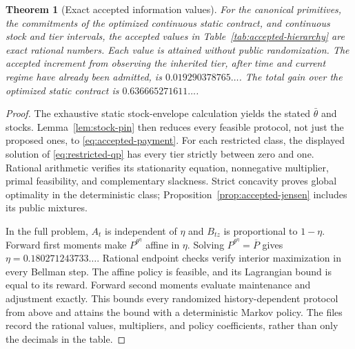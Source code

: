 \documentclass[11pt,letterpaper]{article}
\newtheorem{theorem}{Theorem}[section]
\theoremstyle{definition}
\newcommand{\1}{\mathbf 1}
\begin{document}
\begin{theorem}[Exact accepted information values]\label{thm:accepted-hierarchy}
For the canonical primitives, the commitments of the optimized continuous static contract, and continuous stock and tier intervals, the accepted values in Table~\ref{tab:accepted-hierarchy} are exact rational numbers. Each value is attained without public randomization. The accepted increment from observing the inherited tier, after time and current regime have already been admitted, is $0.019290378765\ldots$. The total gain over the optimized static contract is $0.636665271611\ldots$.
\end{theorem}
\begin{proof}
The exhaustive static stock-envelope calculation yields the stated $\bar\theta$ and stocks. Lemma~\ref{lem:stock-pin} then reduces every feasible protocol, not just the proposed ones, to \eqref{eq:accepted-payment}. For each restricted class, the displayed solution of \eqref{eq:restricted-qp} has every tier strictly between zero and one. Rational arithmetic verifies its stationarity equation, nonnegative multiplier, primal feasibility, and complementary slackness. Strict concavity proves global optimality in the deterministic class; Proposition~\ref{prop:accepted-jensen} includes its public mixtures.

In the full problem, $A_t$ is independent of $\eta$ and $B_{tz}$ is proportional to $1-\eta$. Forward first moments make $P^{\theta^\eta}$ affine in $\eta$. Solving $P^{\theta^\eta}=\overline P$ gives $\eta=0.180271243733\ldots$. Rational endpoint checks verify interior maximization in every Bellman step. The affine policy is feasible, and its Lagrangian bound is equal to its reward. Forward second moments evaluate maintenance and adjustment exactly. This bounds every randomized history-dependent protocol from above and attains the bound with a deterministic Markov policy. The files record the rational values, multipliers, and policy coefficients, rather than only the decimals in the table.
\end{proof}
\end{document}
